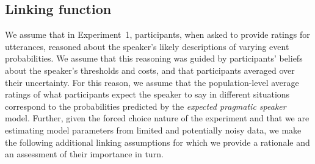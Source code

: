 \documentclass[man, floatsintext]{apa6}
\begin{document}



\subsection{Linking function}

We assume that in Experiment~1, participants, when asked to provide ratings for utterances, reasoned about the speaker's likely descriptions of varying event probabilities. 
We assume that this reasoning was guided by participants' beliefs about the speaker's thresholds and costs, and 
that participants averaged over their uncertainty. For this reason, we assume that the population-level 
average ratings of what participants expect the speaker to say in different situations 
correspond to the probabilities predicted by the \textit{expected pragmatic speaker} model.
Further, given the forced choice nature of the experiment and that we are estimating model 
parameters from limited and potentially noisy data, we make the following additional linking assumptions
for which we provide a rationale and an assessment of their importance in turn.
\end{document}
